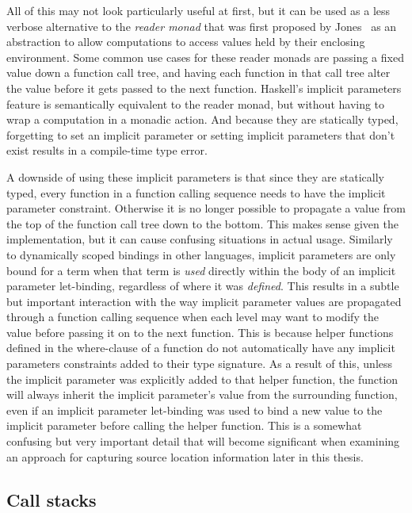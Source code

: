 \documentclass[fontsize=11pt,a4paper,parskip=half,numbers=noenddot]{scrartcl}
\begin{document}
All of this may not look particularly useful at first, but it can be used as a
less verbose alternative to the \emph{reader monad} that was first proposed by
Jones~\cite{jones1995functionalprogramming} as an abstraction to allow
computations to access values held by their enclosing environment. Some common
use cases for these reader monads are passing a fixed value down a function call
tree, and having each function in that call tree alter the value before it gets
passed to the next function. Haskell's implicit parameters feature is
semantically equivalent to the reader monad, but without having to wrap a
computation in a monadic action. And because they are statically typed,
forgetting to set an implicit parameter or setting implicit parameters that
don't exist results in a compile-time type error.

A downside of using these implicit parameters is that since they are statically
typed, every function in a function calling sequence needs to have the implicit
parameter constraint. Otherwise it is no longer possible to propagate a value
from the top of the function call tree down to the bottom. This makes sense
given the implementation, but it can cause confusing situations in actual usage.
Similarly to dynamically scoped bindings in other languages, implicit parameters
are only bound for a term when that term is \emph{used} directly within the body
of an implicit parameter let-binding, regardless of where it was \emph{defined}.
This results in a subtle but important interaction with the way implicit
parameter values are propagated through a function calling sequence when each
level may want to modify the value before passing it on to the next function.
This is because helper functions defined in the where-clause of a function do
not automatically have any implicit parameters constraints added to their type
signature. As a result of this, unless the implicit parameter was explicitly
added to that helper function, the function will always inherit the implicit
parameter's value from the surrounding function, even if an implicit parameter
let-binding was used to bind a new value to the implicit parameter before
calling the helper function. This is a somewhat confusing but very important
detail that will become significant when examining an approach for capturing
source location information later in this thesis.

\subsection{Call stacks}\label{sec:call-stacks}
\end{document}
